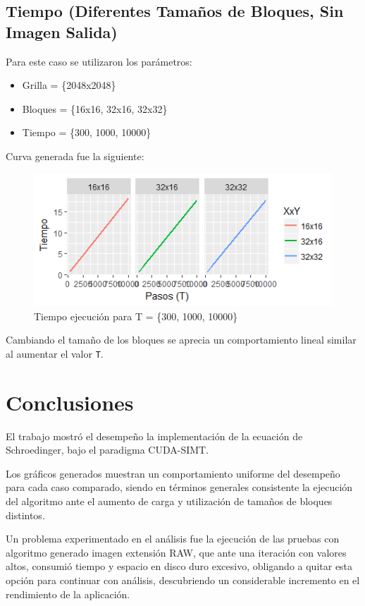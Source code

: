 \documentclass[jou]{apa6}
\begin{document}
\subsection{Tiempo (Diferentes Tamaños de Bloques, Sin Imagen Salida)}
Para este caso se utilizaron los parámetros:

\begin{itemize}
	\item Grilla = \{2048x2048\}
	\item Bloques = \{16x16, 32x16, 32x32\}
	\item Tiempo = \{300, 1000, 10000\}
\end{itemize}

Curva generada fue la siguiente:

\begin{figure}[h]
	\includegraphics[width=\columnwidth]{time-diff-block-size-no-raw.png}
	\caption{Tiempo ejecución para T = \{300, 1000, 10000\}}
	\label{fig:Figure3}
\end{figure}

Cambiando el tamaño de los bloques se aprecia un comportamiento lineal similar al aumentar el valor \texttt{T}.

\section{Conclusiones}

El trabajo mostró el desempeño la implementación de la ecuación de Schroedinger, bajo el paradigma CUDA-SIMT.

Los gráficos generados muestran un comportamiento uniforme del desempeño para cada caso comparado, siendo en términos generales consistente la ejecución del algoritmo ante el aumento de carga y utilización de tamaños de bloques distintos.

Un problema experimentado en el análisis fue la ejecución de las pruebas con algoritmo generado imagen extensión RAW, que ante una iteración con valores altos, consumió tiempo y espacio en disco duro excesivo, obligando a quitar esta opción para continuar con análisis, descubriendo un considerable incremento en el rendimiento de la aplicación.
\end{document}
